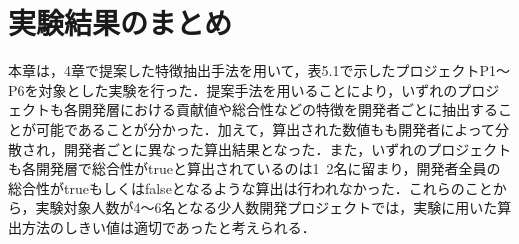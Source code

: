 \documentclass{funthesis}
\begin{document}
\section{実験結果のまとめ}
本章は，4章で提案した特徴抽出手法を用いて，表5.1で示したプロジェクトP1〜P6を対象とした実験を行った．提案手法を用いることにより，いずれのプロジェクトも各開発層における貢献値や総合性などの特徴を開発者ごとに抽出することが可能であることが分かった．加えて，算出された数値もも開発者によって分散され，開発者ごとに異なった算出結果となった．また，いずれのプロジェクトも各開発層で総合性がtrueと算出されているのは1~2名に留まり，開発者全員の総合性がtrueもしくはfalseとなるような算出は行われなかった．これらのことから，実験対象人数が4〜6名となる少人数開発プロジェクトでは，実験に用いた算出方法のしきい値は適切であったと考えられる．

\end{document}
